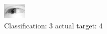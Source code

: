 \begin{figure}[h!]
\begin{center}
\includegraphics[width=0.60\columnwidth]{figures/ID2430_class_3_target_4.png}
\end{center}
\caption{ Classification: 3 actual target: 4}
\label{fig:ID2430_class_3_target_4}
\end{figure}
